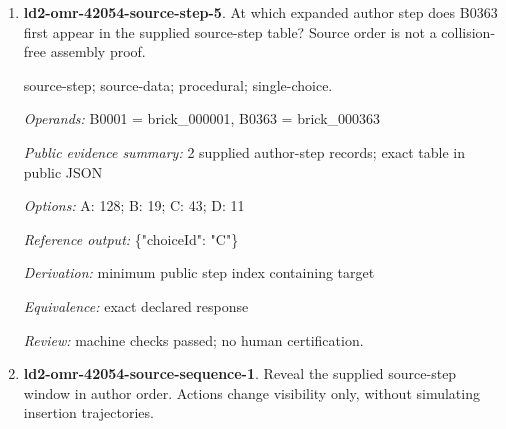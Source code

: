 \begin{enumerate}
\item \textbf{ld2-omr-42054-source-step-5}. At which expanded author step does B0363 first appear in the supplied source-step table? Source order is not a collision-free assembly proof.
\par{\small source-step; source-data; procedural; single-choice.\par\textit{Operands:} B0001 = brick\_000001, B0363 = brick\_000363\par\textit{Public evidence summary:} 2 supplied author-step records; exact table in public JSON\par\textit{Options:} A: 128; B: 19; C: 43; D: 11\par\textit{Reference output:} \{"choiceId": "C"\}\par\textit{Derivation:} minimum public step index containing target\par\textit{Equivalence:} exact declared response\par\textit{Review:} machine checks passed; no human certification.}
\item \textbf{ld2-omr-42054-source-sequence-1}. Reveal the supplied source-step window in author order. Actions change visibility only, without simulating insertion trajectories.

\end{enumerate}

